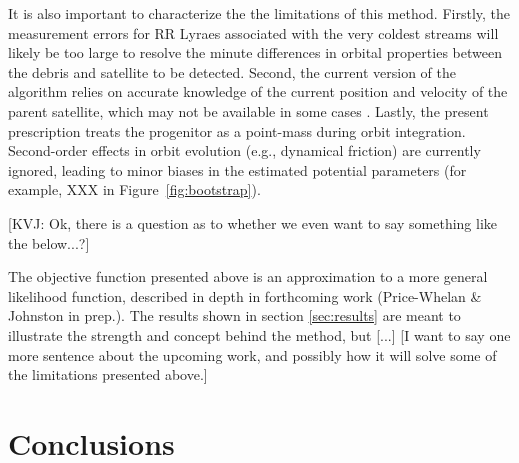 \documentclass[preprint]{aastex}
\begin{document}
It is also important to characterize the the limitations of this
method. Firstly, the measurement errors for RR Lyraes associated with
the very coldest streams \citep[e.g., the globular clusters Pal5 and
  GD1;][]{odenkirchen02,koposov10} will likely be too large to resolve
the minute differences in orbital properties between the debris and
satellite to be detected. Second, the current version of the algorithm
relies on accurate knowledge of the current position and velocity of
the parent satellite, which may not be available in some cases
\citep[for example, the Orphan Stream;][]{belokurov07}. Lastly, the
present prescription treats the progenitor as a point-mass during
orbit integration. Second-order effects in orbit evolution (e.g.,
dynamical friction) are currently ignored, leading to minor biases in
the estimated potential parameters (for example, XXX in
Figure~\ref{fig:bootstrap}).

[KVJ: Ok, there is a question as to whether we even want to say something like the below...?]

The objective function presented above is an approximation to a more
general likelihood function, described in depth in forthcoming work
(Price-Whelan \& Johnston in prep.). The results shown in section
\ref{sec:results} are meant to illustrate the strength and concept
behind the method, but [...] [I want to say one more sentence about
  the upcoming work, and possibly how it will solve some of the
  limitations presented above.]


\section{Conclusions}
\label{sec:conclusion}
\end{document}
